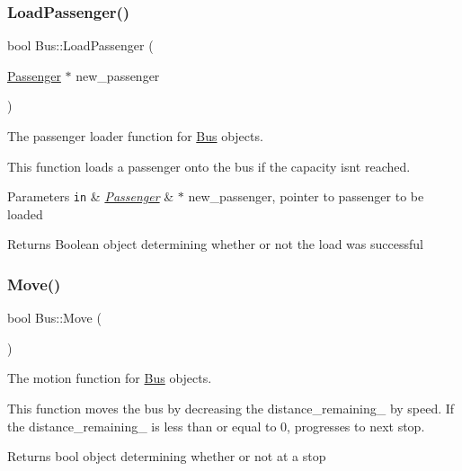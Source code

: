 \subsubsection{\texorpdfstring{Load\+Passenger()}{LoadPassenger()}}
{\footnotesize\ttfamily bool Bus\+::\+Load\+Passenger (\begin{DoxyParamCaption}\item[{\hyperlink{classPassenger}{Passenger} $\ast$}]{new\+\_\+passenger }\end{DoxyParamCaption})}



The passenger loader function for \hyperlink{classBus}{Bus} objects. 

This function loads a passenger onto the bus if the capacity isn\textquotesingle{}t reached.


\begin{DoxyParams}[1]{Parameters}
\mbox{\tt in}  & {\em \hyperlink{classPassenger}{Passenger}} & $\ast$ new\+\_\+passenger, pointer to passenger to be loaded\\
\hline
\end{DoxyParams}
\begin{DoxyReturn}{Returns}
Boolean object determining whether or not the load was successful 
\end{DoxyReturn}
\mbox{\label{classBus_a5e667186d6db0916ebab0e4eff3312c8}} 
\subsubsection{\texorpdfstring{Move()}{Move()}}
{\footnotesize\ttfamily bool Bus\+::\+Move (\begin{DoxyParamCaption}{ }\end{DoxyParamCaption})}



The motion function for \hyperlink{classBus}{Bus} objects. 

This function moves the bus by decreasing the distance\+\_\+remaining\+\_\+ by speed. If the distance\+\_\+remaining\+\_\+ is less than or equal to 0, progresses to next stop.

\begin{DoxyReturn}{Returns}
bool object determining whether or not at a stop 
\end{DoxyReturn}
\mbox{\label{classBus_a695e790984f5cf7bbec85fe422466b48}} 
